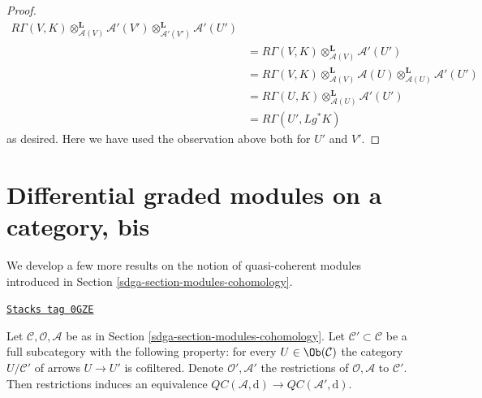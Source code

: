 \begin{proof}
\begin{align*}
R\Gamma(V, K) \otimes_{\mathcal{A}(V)}^\mathbf{L} \mathcal{A}'(V')
\otimes_{\mathcal{A}'(V')}^\mathbf{L} \mathcal{A}'(U') \\
& =
R\Gamma(V, K) \otimes_{\mathcal{A}(V)}^\mathbf{L} \mathcal{A}'(U') \\
& =
R\Gamma(V, K) \otimes_{\mathcal{A}(V)}^\mathbf{L} \mathcal{A}(U)
\otimes_{\mathcal{A}(U)}^\mathbf{L} \mathcal{A}'(U') \\
& =
R\Gamma(U, K) \otimes_{\mathcal{A}(U)}^\mathbf{L} \mathcal{A}'(U') \\
& =
R\Gamma(U', Lg^*K)
\end{align*}
as desired. Here we have used the observation above both for $U'$ and $V'$.
\end{proof}

\section{Differential graded modules on a category, bis}
\label{sdga-section-modules-cohomology-bis}
We develop a few more results on the notion of quasi-coherent
modules introduced in Section \ref{sdga-section-modules-cohomology}.

\begin{lemma}
\label{sdga-lemma-cartesian-cofinal-subcategory}
\href{https://stacks.math.columbia.edu/tag/0GZE}{\texttt{Stacks tag 0GZE}}

Let $\mathcal{C}, \mathcal{O}, \mathcal{A}$ be as in
Section \ref{sdga-section-modules-cohomology}. Let
$\mathcal{C}' \subset \mathcal{C}$ be a full subcategory
with the following property: for every $U \in \Ob(\mathcal{C})$ the
category $U/\mathcal{C}'$ of arrows $U \to U'$ is cofiltered.
Denote $\mathcal{O}', \mathcal{A}'$ the restrictions
of $\mathcal{O}, \mathcal{A}$ to $\mathcal{C}'$.
Then restrictions induces an equivalence
$\mathit{QC}(\mathcal{A}, \text{d}) \to \mathit{QC}(\mathcal{A}', \text{d})$.
\end{lemma}


